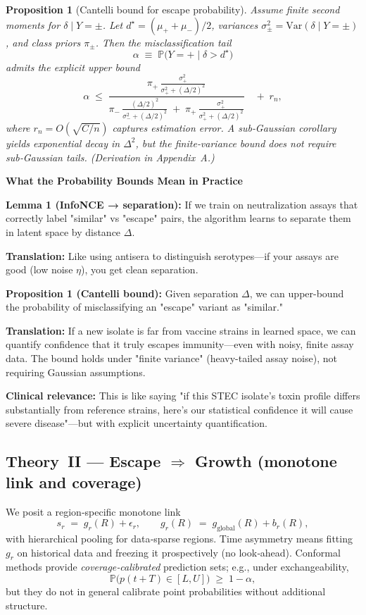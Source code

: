 \documentclass[11pt]{article}
\newtheorem{proposition}{Proposition}
\begin{document}
\begin{proposition}[Cantelli bound for escape probability]
\label{prop:cantelli}
Assume finite second moments for $\delta\mid Y=\pm$. Let $d^\star=(\mu_++\mu_-)/2$, variances $\sigma_\pm^2=\mathrm{Var}(\delta\mid Y=\pm)$, and class priors $\pi_\pm$. Then the misclassification tail
\[
\alpha \;\equiv\; \mathbb{P}\!\big(Y=+\mid \delta>d^\star\big)
\]
admits the explicit upper bound
\[
\alpha \;\le\;
\frac{\displaystyle \pi_+\,\frac{\sigma_+^2}{\sigma_+^2+(\Delta/2)^2}}
{\displaystyle \pi_-\,\frac{(\Delta/2)^2}{\sigma_-^2+(\Delta/2)^2}
\;+\; \pi_+\,\frac{\sigma_+^2}{\sigma_+^2+(\Delta/2)^2}}
\quad+\; r_n,
\]
where $r_n=O(\sqrt{C/n})$ captures estimation error. A sub‑Gaussian corollary yields exponential decay in $\Delta^2$, but the finite‑variance bound does not require sub‑Gaussian tails. (Derivation in Appendix~A.)
\end{proposition}

\begin{mdframed}[backgroundcolor=yellow!5]
\textbf{What the Probability Bounds Mean in Practice}

\textbf{Lemma 1 (InfoNCE → separation):} If we train on neutralization assays that correctly label "similar" vs "escape" pairs, the algorithm learns to separate them in latent space by distance $\Delta$. 

\textbf{Translation:} Like using antisera to distinguish serotypes—if your assays are good (low noise $\eta$), you get clean separation.

\textbf{Proposition 1 (Cantelli bound):} Given separation $\Delta$, we can upper-bound the probability of misclassifying an "escape" variant as "similar."

\textbf{Translation:} If a new isolate is far from vaccine strains in learned space, we can quantify confidence that it truly escapes immunity—even with noisy, finite assay data. The bound holds under "finite variance" (heavy-tailed assay noise), not requiring Gaussian assumptions.

\textbf{Clinical relevance:} This is like saying "if this STEC isolate's toxin profile differs substantially from reference strains, here's our statistical confidence it will cause severe disease"—but with explicit uncertainty quantification.
\end{mdframed}

\subsection{Theory II — Escape $\Rightarrow$ Growth (monotone link and coverage)}
We posit a region‑specific monotone link
\begin{equation}
s_r \;=\; g_r(R) + \epsilon_r,\qquad
g_r(R) \;=\; g_{\text{global}}(R) + b_r(R),
\end{equation}
with hierarchical pooling for data‑sparse regions. Time asymmetry means fitting $g_r$ on historical data and freezing it prospectively (no look‑ahead). Conformal methods provide \emph{coverage‑calibrated} prediction sets; e.g., under exchangeability,
\[
\mathbb{P}\!\big(p(t{+}T)\in[L,U]\big)\;\ge\;1-\alpha,
\]
but they do not in general calibrate point probabilities without additional structure.
\end{document}
